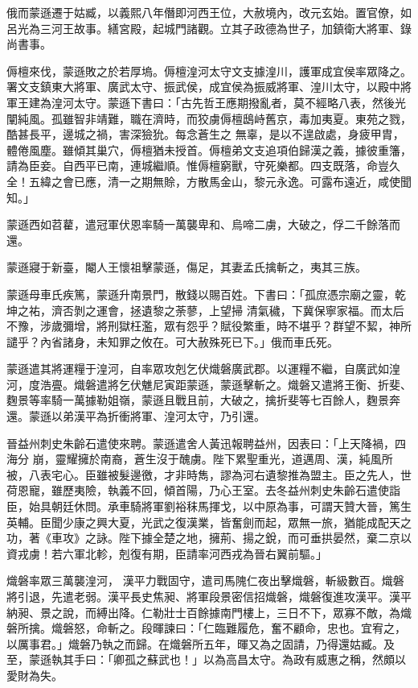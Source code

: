 \begin{pinyinscope}
 俄而蒙遜遷于姑臧，以義熙八年僭即河西王位，大赦境內，改元玄始。置官僚，如呂光為三河王故事。繕宮殿，起城門諸觀。立其子政德為世子，加鎮衛大將軍、錄尚書事。



 傉檀來伐，蒙遜敗之於若厚塢。傉檀湟河太守文支據湟川，護軍成宜侯率眾降之。署文支鎮東大將軍、廣武太守、振武侯，成宜侯為振威將軍、湟川太守，以殿中將軍王建為湟河太守。蒙遜下書曰：「古先哲王應期撥亂者，莫不經略八表，然後光闡純風。孤雖智非靖難，職在濟時，而狡虜傉檀鴟峙舊京，毒加夷夏。東苑之戮，酷甚長平，邊城之禍，害深獫狁。每念蒼生之
 無辜，是以不遑啟處，身疲甲胄，體倦風塵。雖傾其巢穴，傉檀猶未授首。傉檀弟文支追項伯歸漢之義，據彼重籓，請為臣妾。自西平已南，連城繼順。惟傉檀窮獸，守死樂都。四支既落，命豈久全！五緯之會已應，清一之期無賒，方散馬金山，黎元永逸。可露布遠近，咸使聞知。」



 蒙遜西如苕藋，遣冠軍伏恩率騎一萬襲卑和、烏啼二虜，大破之，俘二千餘落而還。



 蒙遜寢于新臺，閹人王懷祖擊蒙遜，傷足，其妻孟氏擒斬之，夷其三族。



 蒙遜母車氏疾篤，蒙遜升南景門，散錢以賜百姓。下書曰：「孤庶憑宗廟之靈，乾坤之祐，濟否剝之運會，拯遺黎之荼蓼，上望掃
 清氣穢，下冀保寧家福。而太后不豫，涉歲彌增，將刑獄枉濫，眾有怨乎？賦役繁重，時不堪乎？群望不絜，神所譴乎？內省諸身，未知罪之攸在。可大赦殊死已下。」俄而車氏死。



 蒙遜遣其將運糧于湟河，自率眾攻剋乞伏熾磐廣武郡。以運糧不繼，自廣武如湟河，度浩亹。熾磐遣將乞伏魋尼寅距蒙遜，蒙遜擊斬之。熾磐又遣將王衡、折斐、麴景等率騎一萬據勒姐嶺，蒙遜且戰且前，大破之，擒折斐等七百餘人，麴景奔還。蒙遜以弟漢平為折衝將軍、湟河太守，乃引還。



 晉益州刺史朱齡石遣使來聘。蒙遜遣舍人黃迅報聘益州，因表曰：「上天降禍，四海分
 崩，靈耀擁於南裔，蒼生沒于醜虜。陛下累聖重光，道邁周、漢，純風所被，八表宅心。臣雖被髮邊徼，才非時雋，謬為河右遺黎推為盟主。臣之先人，世荷恩寵，雖歷夷險，執義不回，傾首陽，乃心王室。去冬益州刺史朱齡石遣使詣臣，始具朝廷休問。承車騎將軍劉裕秣馬揮戈，以中原為事，可謂天贊大晉，篤生英輔。臣聞少康之興大夏，光武之復漢業，皆奮劍而起，眾無一旅，猶能成配天之功，著《車攻》之詠。陛下據全楚之地，擁荊、揚之銳，而可垂拱晏然，棄二京以資戎虜！若六軍北軫，剋復有期，臣請率河西戎為晉右翼前驅。」



 熾磐率眾三萬襲湟河，
 漢平力戰固守，遣司馬隗仁夜出擊熾磐，斬級數百。熾磐將引退，先遣老弱。漢平長史焦昶、將軍段景密信招熾磐，熾磐復進攻漢平。漢平納昶、景之說，而縛出降。仁勒壯士百餘據南門樓上，三日不下，眾寡不敵，為熾磐所擒。熾磐怒，命斬之。段暉諫曰：「仁臨難履危，奮不顧命，忠也。宜宥之，以厲事君。」熾磐乃執之而歸。在熾磐所五年，暉又為之固請，乃得還姑臧。及至，蒙遜執其手曰：「卿孤之蘇武也！」以為高昌太守。為政有威惠之稱，然頗以愛財為失。




\end{pinyinscope}
